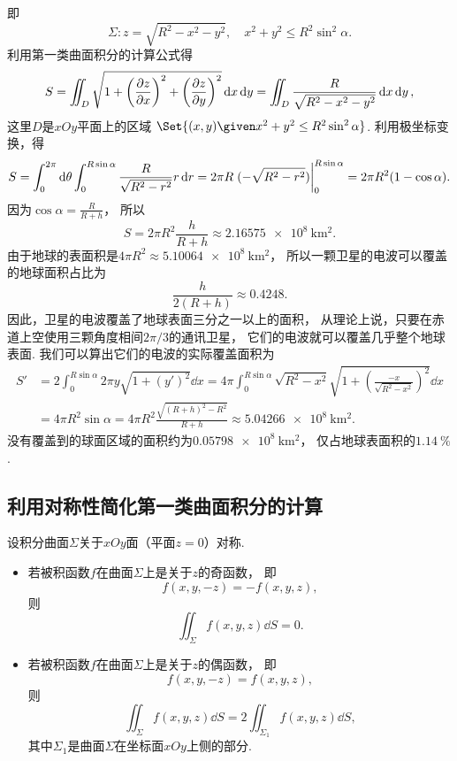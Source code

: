 \begin{example}
即\[
	\Sigma: z=\sqrt{R^2-x^2-y^2}, \quad x^2+y^2 \leq R^2\sin^2\alpha.
\]
利用第一类曲面积分的计算公式得\[
	S = \iint_D \sqrt{1+\left(\pdv{z}{x}\right)^2+\left(\pdv{z}{y}\right)^2} \dd{x}\dd{y}
	= \iint_D \frac{R}{\sqrt{R^2-x^2-y^2}} \dd{x}\dd{y},
\]
这里\(D\)是\(xOy\)平面上的区域
\(\Set{ (x,y) \given x^2+y^2 \leq R^2\sin^2\alpha }\).
利用极坐标变换，得\[
	S = \int_0^{2\pi} \dd\theta
	\int_0^{R\sin\alpha} \frac{R}{\sqrt{R^2-r^2}} r\dd{r}
	= 2\pi R \eval{(-\sqrt{R^2-r^2})}_0^{R\sin\alpha}
	= 2\pi R^2(1-\cos\alpha).
\]
因为\(\cos\alpha=\frac{R}{R+h}\)，
所以\[
	S = 2\pi R^2\frac{h}{R+h}
	\approx \qty{2.16575e8}{\kilo\meter\squared}.
\]
由于地球的表面积是\(4\pi R^2 \approx \qty{5.10064e8}{\kilo\meter\squared}\)，
所以一颗卫星的电波可以覆盖的地球面积占比为\[
	\frac{h}{2(R+h)}
	\approx \num{0.4248}.
\]
因此，卫星的电波覆盖了地球表面三分之一以上的面积，
从理论上说，只要在赤道上空使用三颗角度相间\(2\pi/3\)的通讯卫星，
它们的电波就可以覆盖几乎整个地球表面.
我们可以算出它们的电波的实际覆盖面积为\begin{align*}
	S' &= 2\int_0^{R\sin\alpha} 2\pi y \sqrt{1+(y')^2} \dd{x}
	= 4\pi \int_0^{R\sin\alpha} \sqrt{R^2-x^2} \sqrt{1+\left(\frac{-x}{\sqrt{R^2-x^2}}\right)^2} \dd{x} \\
	&= 4\pi R^2\sin\alpha
	= 4\pi R^2 \frac{\sqrt{(R+h)^2-R^2}}{R+h}
	\approx \qty{5.04266e8}{\kilo\meter\squared}.
\end{align*}
没有覆盖到的球面区域的面积约为\(\qty{0.05798e8}{\kilo\meter\squared}\)，
仅占地球表面积的\(\qty{1.14}{\percent}\).
\end{example}

\subsection{利用对称性简化第一类曲面积分的计算}
设积分曲面\(\Sigma\)关于\(xOy\)面（平面\(z=0\)）对称.
\begin{itemize}
	\item 若被积函数\(f\)在曲面\(\Sigma\)上是关于\(z\)的奇函数，
	即\[
		f(x,y,-z) = -f(x,y,z),
	\]
	则\[
		\iint_\Sigma f(x,y,z) \dd{S} = 0.
	\]

	\item 若被积函数\(f\)在曲面\(\Sigma\)上是关于\(z\)的偶函数，
	即\[
		f(x,y,-z) = f(x,y,z),
	\]
	则\[
		\iint_\Sigma f(x,y,z) \dd{S}
		= 2 \iint_{\Sigma_1} f(x,y,z) \dd{S},
	\]
	其中\(\Sigma_1\)是曲面\(\Sigma\)在坐标面\(xOy\)上侧的部分.
\end{itemize}

